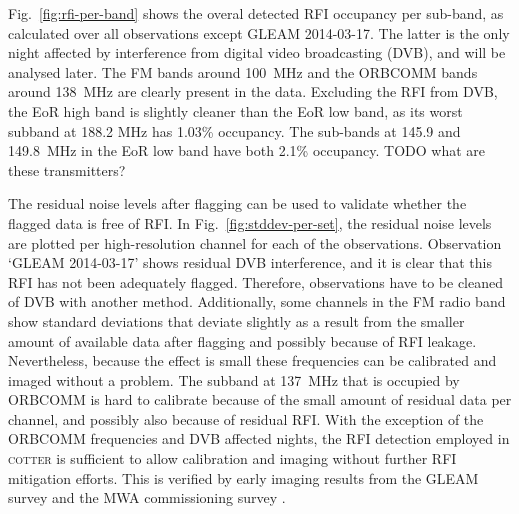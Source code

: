 \documentclass{pasa}
\begin{document}
Fig.~\ref{fig:rfi-per-band} shows the overal detected RFI occupancy per sub-band, as calculated over all observations except GLEAM 2014-03-17. The latter is the only night affected by interference from digital video broadcasting (DVB), and will be analysed later. The FM bands around 100~MHz and the ORBCOMM bands around 138~MHz are clearly present in the data. Excluding the RFI from DVB, the EoR high band is slightly cleaner than the EoR low band, as its worst subband at 188.2 MHz has 1.03\% occupancy. The sub-bands at 145.9 and 149.8~MHz in the EoR low band have both 2.1\% occupancy. TODO what are these transmitters?

The residual noise levels after flagging can be used to validate whether the flagged data is free of RFI. In Fig.~\ref{fig:stddev-per-set}, the residual noise levels are plotted per high-resolution channel for each of the observations. Observation `GLEAM 2014-03-17' shows residual DVB interference, and it is clear that this RFI has not been adequately flagged. Therefore, observations have to be cleaned of DVB with another method. Additionally, some channels in the FM radio band show standard deviations that deviate slightly as a result from the smaller amount of available data after flagging and possibly because of RFI leakage. Nevertheless, because the effect is small these frequencies can be calibrated and imaged without a problem. The subband at 137~MHz that is occupied by ORBCOMM is hard to calibrate because of the small amount of residual data per channel, and possibly also because of residual RFI. With the exception of the ORBCOMM frequencies and DVB affected nights, the RFI detection employed in \textsc{cotter} is sufficient to allow calibration and imaging without further RFI mitigation efforts. This is verified by early imaging results from the GLEAM survey and the MWA commissioning survey \citep{mwacs-2014}.
\end{document}
